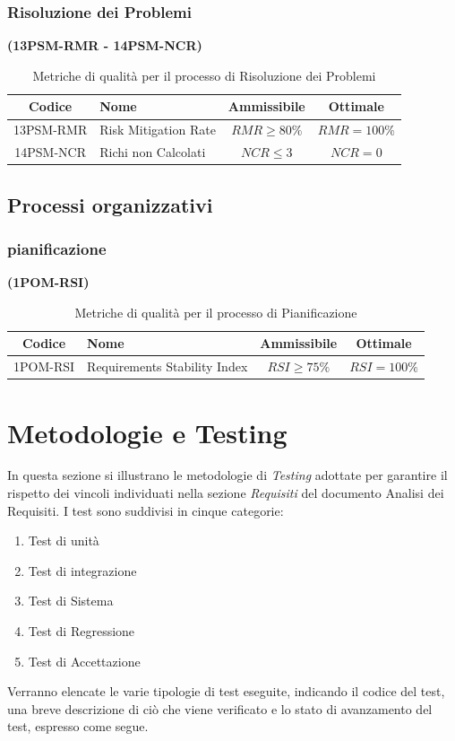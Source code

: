 \documentclass{article}
\begin{document}
\subsubsection{Risoluzione dei Problemi}%
\textbf{(13PSM-RMR - 14PSM-NCR)}
\begin{table}[H]
    \centering
    \renewcommand{\arraystretch}{1.5} %
    \begin{tabular}{|c|l|c|c|}
        \hline
        \textbf{Codice} & \textbf{Nome} & \textbf{Ammissibile} & \textbf{Ottimale} \\
        \hline
        13PSM-RMR & Risk Mitigation Rate & $RMR \geq 80\%$ & $RMR = 100\%$ \\
        14PSM-NCR & Richi non Calcolati & $NCR \leq 3$ & $NCR = 0$ \\
        \hline
    \end{tabular}
    \label{tab:risoluzione_problemi}
    \caption{Metriche di qualità per il processo di Risoluzione dei Problemi}
\end{table}
\subsection{Processi organizzativi}
\subsubsection{pianificazione} %
\textbf{(1POM-RSI)}
\begin{table}[H]
    \centering
    \renewcommand{\arraystretch}{1.5} %
    \begin{tabular}{|c|l|c|c|}
        \hline
        \textbf{Codice} & \textbf{Nome} & \textbf{Ammissibile} & \textbf{Ottimale} \\
        \hline
        1POM-RSI & Requirements Stability Index & $RSI \geq 75\%$ & $RSI = 100\%$ \\
        \hline
    \end{tabular}
    \label{tab:pianificazione}
    \caption{Metriche di qualità per il processo di Pianificazione}
\end{table}

\section{Metodologie e Testing}
In questa sezione si illustrano le metodologie di \textit{Testing} adottate per garantire il rispetto dei vincoli individuati
nella sezione \textit{Requisiti} del documento Analisi dei Requisiti. I test sono suddivisi in cinque categorie:
\begin{enumerate}
    \item Test di unità
    \item Test di integrazione
    \item Test di Sistema
    \item Test di Regressione
    \item Test di Accettazione
\end{enumerate}
Verranno elencate le varie tipologie di test eseguite, indicando il codice del test, una breve descrizione di ciò che viene verificato e lo stato di avanzamento del test, espresso come segue.
\end{document}
